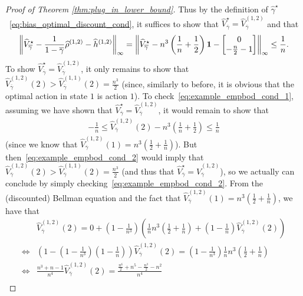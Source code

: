 \documentclass{article}
\theoremstyle{plain}
\theoremstyle{plain}
\theoremstyle{remark}
\theoremstyle{plain}
\theoremstyle{plain}
\newcommand{\Vhat}{\widehat{V}}
\newcommand{\one}{\mathbf{1}}
\newcommand{\rhohat}{\widehat{\rho}}
\newcommand{\hhat}{\widehat{h}}
\newcommand{\gammared}{{\overline{\gamma}}}
\newcommand{\empbod}{\widehat{\gamma}^\star}
\begin{document}
\begin{proof}[Proof of Theorem \ref{thm:plug_in_lower_bound}]
Thus by the definition of $\empbod$~\eqref{eq:bias_optimal_discount_cond}, it suffices to show that $\Vhat_{\gammared}^{\star} = \Vhat_{\gammared}^{(1,2)}$ and that
\begin{align}
    \infnorm{\Vhat_{\gammared}^{\star} - \frac{1}{1-\gammared} \rhohat^{(1,2)} -\hhat^{(1,2)} } = \infnorm{\Vhat_{\gammared}^{\star} - n^3 \left(\frac{1}{n} + \frac{1}{2} \right)\one  - \begin{bmatrix}
        0 \\ -\frac{n}{2} - 1
    \end{bmatrix} } \leq \frac{1}{n}. \label{eq:example_empbod_cond_1}
\end{align}
To show $\Vhat_{\gammared}^{\star} = \Vhat_{\gammared}^{(1,2)}$, it only remains to show that $\Vhat_{\gammared}^{(1,2)}(2) > \Vhat_{\gammared}^{(1,1)}(2) = \frac{n^3}{2}$ (since, similarly to before, it is obvious that the optimal action in state $1$ is action $1$). To check~\eqref{eq:example_empbod_cond_1}, assuming we have shown that $\Vhat_{\gammared}^{\star} = \Vhat_{\gammared}^{(1,2)}$, it would remain to show that
\begin{align}
     -\frac{1}{n} \leq \Vhat_{\gammared}^{(1,2)}(2) - n^3 \left(\frac{1}{n} + \frac{1}{2} \right) \leq \frac{1}{n} \label{eq:example_empbod_cond_2}
\end{align}
(since we know that $\Vhat^{(1,2)}_{\gammared}(1) = n^3 \left( \frac{1}{2} + \frac{1}{n }\right)$).
But then~\eqref{eq:example_empbod_cond_2} would imply that $\Vhat_{\gammared}^{(1,2)}(2) > \Vhat_{\gammared}^{(1,1)}(2) = \frac{n^3}{2}$ (and thus that $\Vhat_{\gammared}^{\star} = \Vhat_{\gammared}^{(1,2)}$), so we actually can conclude by simply checking~\eqref{eq:example_empbod_cond_2}. From the (discounted) Bellman equation and the fact that $\Vhat_{\gammared}^{(1,2)}(1) = n^3 \left( \frac{1}{2} + \frac{1}{n }\right)$, we have that
\begin{align*}
    & \Vhat_{\gammared}^{(1,2)}(2) = 0 + \left(1-\frac{1}{n^3}\right) \left(\frac{1}{n}n^3 \left( \frac{1}{2} + \frac{1}{n }\right) + \left(1-\frac{1}{n}\right) \Vhat_{\gammared}^{(1,2)}(2)\right) \\
    \iff & \left(1 - \left(1-\frac{1}{n^3}\right) \left(1-\frac{1}{n}\right)\right) \Vhat_{\gammared}^{(1,2)}(2) = \left(1-\frac{1}{n^3}\right) \frac{1}{n} n^3 \left( \frac{1}{2} + \frac{1}{n }\right) \\
    \iff & \frac{n^3 + n - 1}{n^4} \Vhat_{\gammared}^{(1,2)}(2) = \frac{\frac{n^6}{2} + n^5 - \frac{n^3}{2} - n^2}{n^4} \\

\end{align*}
\end{proof}
\end{document}
